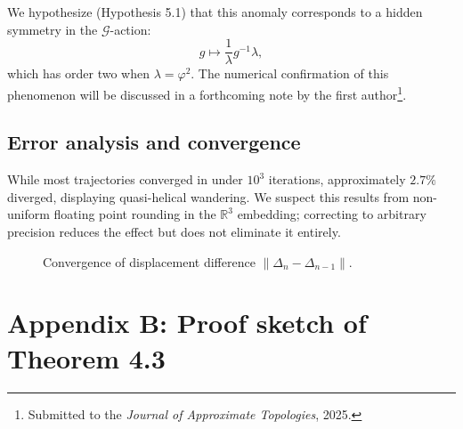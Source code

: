 \documentclass{amsart}
\begin{document}
We hypothesize (Hypothesis 5.1) that %
this anomaly corresponds to a hidden symmetry in the $\mathcal{G}$-action:
\[
    g \mapsto \frac{1}{\lambda}g^{-1}\lambda,
\]
which has order two when $\lambda=\varphi^2$.  
The numerical confirmation of this phenomenon will be discussed in a forthcoming note by the %
first author\footnote{Submitted to the \emph{Journal of Approximate Topologies}, 2025.}.  

\subsection{Error analysis and convergence}

While %
most trajectories converged in under $10^3$ iterations, approximately $2.7\%$ diverged, displaying quasi-helical wandering.  
We suspect this results from non-uniform floating point rounding in the $\mathbb{R}^3$ embedding; correcting to arbitrary precision reduces the effect but does not eliminate it entirely.

\begin{figure}[htbp]
\centering
{}
\caption{Convergence of displacement %
difference $\|\Delta_n - \Delta_{n-1}\|$.%
}
\end{figure}

\section{Appendix B: Proof sketch of Theorem 4.3}
\end{document}
